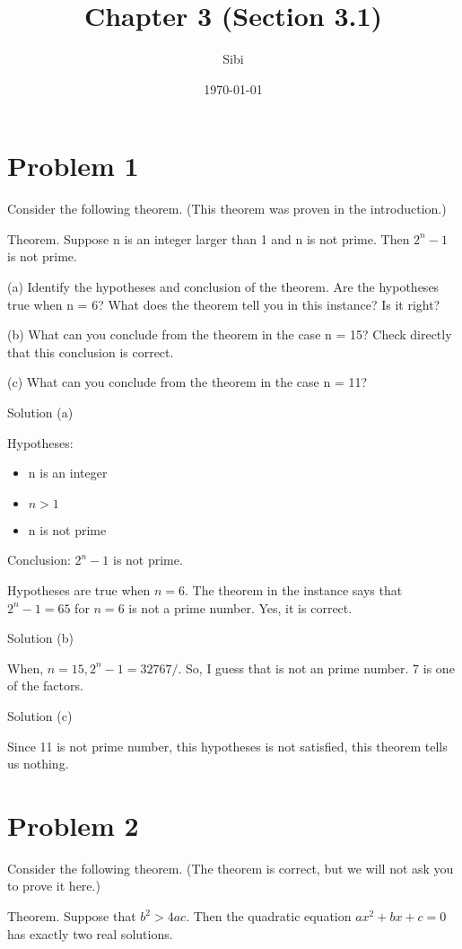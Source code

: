 \documentclass{article}
\begin{document}
\title{Chapter 3 (Section 3.1)}
\author{Sibi}
\date{\today}
\maketitle
\newpage

\section{Problem 1}
Consider the following theorem. (This theorem was proven in the
introduction.)

Theorem. Suppose n is an integer larger than 1 and n is not prime.
Then $2^n - 1$  is not prime.

(a) Identify the hypotheses and conclusion of the theorem. Are the
hypotheses true when n = 6? What does the theorem tell you in this
instance? Is it right?

(b) What can you conclude from the theorem in the case n = 15? Check
directly that this conclusion is correct.

(c) What can you conclude from the theorem in the case n = 11?

Solution (a)

Hypotheses:
\begin{itemize}
\item n is an integer
\item $n > 1$
\item n is not prime
\end{itemize}

Conclusion:
$2^n - 1$ is not prime.

Hypotheses are true when $n = 6$. The theorem in the instance says
that $2^n - 1 = 65$ for $n=6$ is not a prime number. Yes, it is
correct.

Solution (b)

When, $n=15, 2^n - 1 = 32767/$. So, I guess that is not an prime
number. 7 is one of the factors.

Solution (c)

Since 11 is not prime number, this hypotheses is not satisfied, this theorem tells us nothing.

\section{Problem 2}
Consider the following theorem. (The theorem is correct, but we will not
ask you to prove it here.)

Theorem. Suppose that $b^2 > 4ac$. Then the quadratic equation $ax^2 +
bx + c = 0$ has exactly two real solutions.
\end{document}
